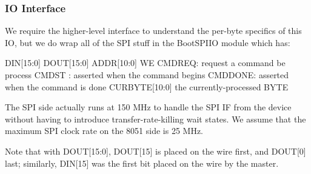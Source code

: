 \subsubsection{IO Interface} 
We require the higher-level interface to understand the per-byte
specifics of this IO, but we do wrap
all of the SPI stuff in the BootSPIIO module which has: 

DIN[15:0]
DOUT[15:0]
ADDR[10:0]
WE 
CMDREQ: request a command be process
CMDST : asserted when the command begins
CMDDONE: asserted when the command is done
CURBYTE[10:0] the currently-processed BYTE

The SPI side actually runs at 150 MHz to handle the SPI IF from the
device without having to introduce transfer-rate-killing wait states.
We assume that the maximum SPI clock rate on the 8051 side is 25 MHz.

Note that with DOUT[15:0], DOUT[15] is placed on the wire first, and
DOUT[0] last; similarly, DIN[15] was the first bit placed on the wire
by the master.

